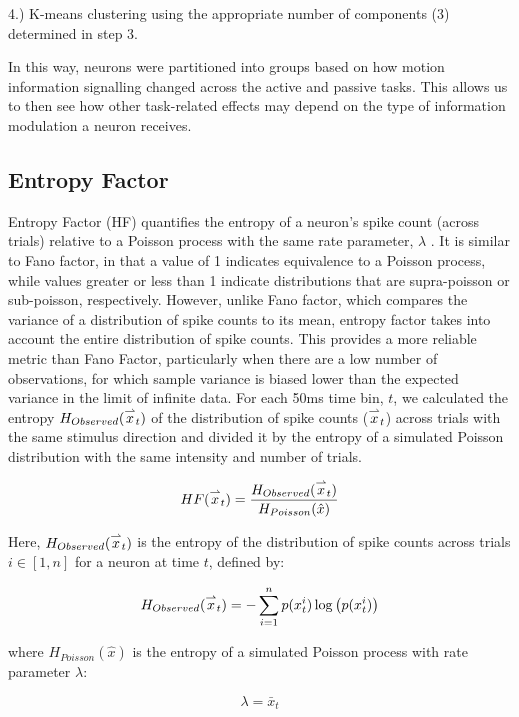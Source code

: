 4.) K-means clustering using the appropriate number of components (3) determined in step 3. 

In this way, neurons were partitioned into groups based on how motion information signalling changed across the active and passive tasks. This allows us to then see how other task-related effects may depend on the type of information modulation a neuron receives.

\subsection*{Entropy Factor} 
Entropy Factor (HF) quantifies the entropy of a neuron's spike count (across trials) relative to a Poisson process with the same rate parameter, $\lambda$ \parencite{Rajdl2017}. It is similar to Fano factor, in that a value of 1 indicates equivalence to a Poisson process, while values greater or less than 1 indicate distributions that are supra-poisson or sub-poisson, respectively. However, unlike Fano factor, which compares the variance of a distribution of spike counts to its mean, entropy factor takes into account the entire distribution of spike counts. This provides a more reliable metric than Fano Factor, particularly when there are a low number of observations, for which sample variance is biased lower than the expected variance in the limit of infinite data. For each 50ms time bin, $t$, we calculated the entropy $H_{Observed}(\overset{\rightharpoonup} x_t)$ of the distribution of spike counts ($\overset{\rightharpoonup} x_t$) across trials with the same stimulus direction and divided it by the entropy of a simulated Poisson distribution with the same intensity and number of trials.

\begin{equation}
HF(\overset{\rightharpoonup} x_t) = \frac{H_{Observed}(\overset{\rightharpoonup} x_t)}{H_{Poisson}( \hat{x})}
\end{equation}

Here, $H_{Observed}(\overset{\rightharpoonup} x_t)$ is the entropy of the distribution of spike counts across trials $i \in [1,n]$ for a neuron at time $t$, defined by:

\begin{equation}
H_{Observed}(\overset{\rightharpoonup} x_t) = - \sum_{i=1}^n{p(x_t^i) \log\left(p(x_t^i)\right)}
\end{equation}

\noindent where $H_{Poisson}(\hat{x})$ is the entropy of a simulated Poisson process with rate parameter $\lambda$:

\begin{equation}
\lambda = \bar{x}_t
\end{equation}

